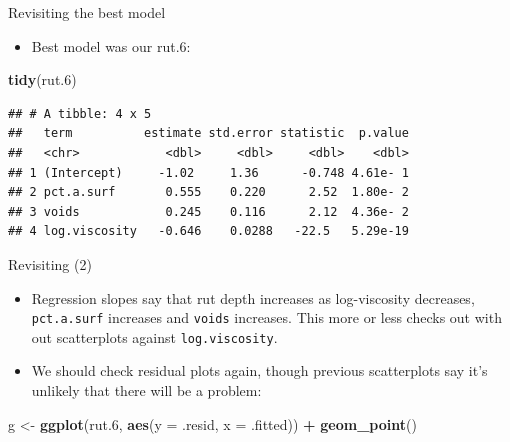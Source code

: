 \documentclass[ignorenonframetext,]{beamer}
\newenvironment{Shaded}{\begin{snugshade}}{\end{snugshade}}
\newcommand{\DataTypeTok}[1]{\textcolor[rgb]{0.13,0.29,0.53}{#1}}
\newcommand{\FloatTok}[1]{\textcolor[rgb]{0.00,0.00,0.81}{#1}}
\newcommand{\KeywordTok}[1]{\textcolor[rgb]{0.13,0.29,0.53}{\textbf{#1}}}
\newcommand{\NormalTok}[1]{#1}
\newcommand{\OperatorTok}[1]{\textcolor[rgb]{0.81,0.36,0.00}{\textbf{#1}}}
\newcommand{\StringTok}[1]{\textcolor[rgb]{0.31,0.60,0.02}{#1}}
\providecommand{\tightlist}{%
  \setlength{\itemsep}{0pt}\setlength{\parskip}{0pt}}
\begin{document}
\begin{frame}[fragile]{Revisiting the best model}
\protect\hypertarget{revisiting-the-best-model}{}

\begin{itemize}
\tightlist
\item
  Best model was our rut.6:
\end{itemize}

\begin{Shaded}
\begin{Highlighting}[]
\KeywordTok{tidy}\NormalTok{(rut}\FloatTok{.6}\NormalTok{)}
\end{Highlighting}
\end{Shaded}

\begin{verbatim}
## # A tibble: 4 x 5
##   term          estimate std.error statistic  p.value
##   <chr>            <dbl>     <dbl>     <dbl>    <dbl>
## 1 (Intercept)     -1.02     1.36      -0.748 4.61e- 1
## 2 pct.a.surf       0.555    0.220      2.52  1.80e- 2
## 3 voids            0.245    0.116      2.12  4.36e- 2
## 4 log.viscosity   -0.646    0.0288   -22.5   5.29e-19
\end{verbatim}

\end{frame}

\begin{frame}[fragile]{Revisiting (2)}
\protect\hypertarget{revisiting-2}{}

\begin{itemize}
\tightlist
\item
  Regression slopes say that rut depth increases as log-viscosity
  decreases, \texttt{pct.a.surf} increases and \texttt{voids} increases.
  This more or less checks out with out scatterplots against
  \texttt{log.viscosity}.
\item
  We should check residual plots again, though previous scatterplots say
  it's unlikely that there will be a problem:
\end{itemize}

\begin{Shaded}
\begin{Highlighting}[]
\NormalTok{g <-}\StringTok{ }\KeywordTok{ggplot}\NormalTok{(rut}\FloatTok{.6}\NormalTok{, }\KeywordTok{aes}\NormalTok{(}\DataTypeTok{y =}\NormalTok{ .resid, }\DataTypeTok{x =}\NormalTok{ .fitted)) }\OperatorTok{+}\StringTok{ }
\KeywordTok{geom_point}\NormalTok{()}
\end{Highlighting}
\end{Shaded}

\end{frame}
\end{document}
